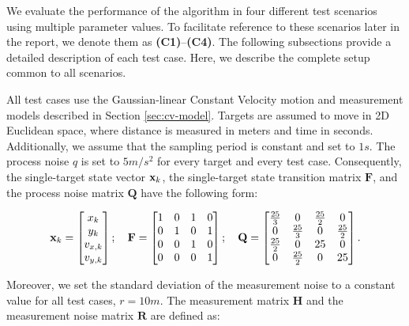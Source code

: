We evaluate the performance of the algorithm in four different test scenarios using multiple parameter values. To facilitate reference to these scenarios later in the report, we denote them as \textbf{(C1)}--\textbf{(C4)}. The following subsections provide a detailed description of each test case. Here, we describe the complete setup common to all scenarios.

All test cases use the Gaussian-linear Constant Velocity motion and measurement models described in Section \ref{sec:cv-model}. Targets are assumed to move in 2D Euclidean space, where distance is measured in meters and time in seconds. Additionally, we assume that the sampling period is constant and set to $1 s$. The process noise $q$ is set to $5 m/s^2$ for every target and every test case. Consequently, the single-target state vector $\vecat{x}{k}$, the single-target state transition matrix $\mathbf{F}$, and the process noise matrix $\mathbf{Q}$ have the following form:

\begin{equation}
    \vecat{x}{k} =
    \begin{bmatrix}
        x_{k} \\ 
        y_{k} \\ 
        v_{x,k} \\ 
        v_{y,k}
    \end{bmatrix};
    \quad
    \mathbf{F} =
    \begin{bmatrix}
       1 & 0 & 1 & 0 \\
       0 & 1 & 0 & 1 \\
       0 & 0 & 1 & 0 \\
       0 & 0 & 0 & 1 
    \end{bmatrix};
    \quad
    \mathbf{Q} = \begin{bmatrix}
        \frac{25}{3}    & 0             & \frac{25}{2}      & 0  \\
        0               & \frac{25}{3}  & 0                 & \frac{25}{2} \\
        \frac{25}{2}    & 0             & 25                & 0 \\
        0               & \frac{25}{2}  & 0                 & 25
    \end{bmatrix}.
\end{equation}

Moreover, we set the standard deviation of the measurement noise to a constant value for all test cases, $r = 10 m$. The measurement matrix $\mathbf{H}$ and the measurement noise matrix $\mathbf{R}$ are defined as:

